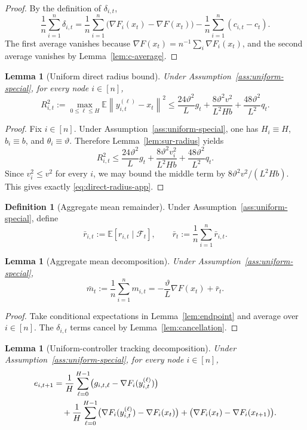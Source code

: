 \documentclass{article}
\newtheorem{lemma}[theorem]{Lemma}
\theoremstyle{definition}
\newtheorem{definition}[theorem]{Definition}
\newcommand{\EE}{\mathbb E}
\newcommand{\cF}{\mathcal F}
\newcommand{\norm}[1]{\left\lVert #1\right\rVert}
\begin{document}
\begin{proof}
By the definition of $\delta_{i,t}$,
\[
\frac1n\sum_{i=1}^n \delta_{i,t}
=
\frac1n\sum_{i=1}^n
\bigl(\nabla F_i(x_t)-\nabla F(x_t)\bigr)
-
\frac1n\sum_{i=1}^n(c_{i,t}-c_t).
\]
The first average vanishes because
$\nabla F(x_t)=n^{-1}\sum_i \nabla F_i(x_t)$, and the second average vanishes by
Lemma~\ref{lem:c-average}.
\end{proof}

\begin{lemma}[Uniform direct radius bound]
\label{lem:direct-radius}
Under Assumption~\ref{ass:uniform-special}, for every node $i\in[n]$,
\begin{equation}
R_{i,t}^2
:=
\max_{0\le \ell\le H}\EE\norm{y_{i,t}^{(\ell)}-x_t}^2
\le
\frac{24\vartheta^2}{L}g_t
+
\frac{8\vartheta^2 v^2}{L^2 H b}
+
\frac{48\vartheta^2}{L^2}q_t.
\label{eq:direct-radius-app}\end{equation}
\end{lemma}

\begin{proof}
Fix $i\in[n]$. Under Assumption~\ref{ass:uniform-special}, one has
$H_i\equiv H$, $b_i\equiv b$, and $\theta_i\equiv \vartheta$. Therefore
Lemma~\ref{lem:sur-radius} yields
\[
R_{i,t}^2
\le
\frac{24\vartheta^2}{L}g_t
+
\frac{8\vartheta^2v_i^2}{L^2Hb}
+
\frac{48\vartheta^2}{L^2}q_t.
\]
Since $v_i^2\le v^2$ for every $i$, we may bound the middle term by
$8\vartheta^2v^2/(L^2Hb)$. This gives exactly
\eqref{eq:direct-radius-app}.
\end{proof}

\begin{definition}[Aggregate mean remainder]
\label{def:rbart}
Under Assumption~\ref{ass:uniform-special}, define
\[
\bar r_{i,t}:=\EE[r_{i,t}\mid \cF_t],
\qquad
\bar r_t:=\frac1n\sum_{i=1}^n \bar r_{i,t}.
\]
\end{definition}

\begin{lemma}[Aggregate mean decomposition]
\label{lem:agg-mean}
Under Assumption~\ref{ass:uniform-special},
\[
\bar m_t
:=
\frac1n\sum_{i=1}^n m_{i,t}
=
-\frac{\vartheta}{L}\nabla F(x_t)+\bar r_t.
\]
\end{lemma}

\begin{proof}
Take conditional expectations in Lemma~\ref{lem:endpoint} and average over
$i\in[n]$. The $\delta_{i,t}$ terms cancel by Lemma~\ref{lem:cancellation}.
\end{proof}

\begin{lemma}[Uniform-controller tracking decomposition]
\label{lem:tracking-direct}
Under Assumption~\ref{ass:uniform-special}, for every node $i\in[n]$,
\begin{align*}
e_{i,t+1}
&=
\frac1H\sum_{\ell=0}^{H-1}
\bigl(g_{i,t,\ell}-\nabla F_i(y_{i,t}^{(\ell)})\bigr)
\notag\\
&\quad+
\frac1H\sum_{\ell=0}^{H-1}
\bigl(\nabla F_i(y_{i,t}^{(\ell)})-\nabla F_i(x_t)\bigr)
+
\bigl(\nabla F_i(x_t)-\nabla F_i(x_{t+1})\bigr).
\end{align*}
\end{lemma}
\end{document}
